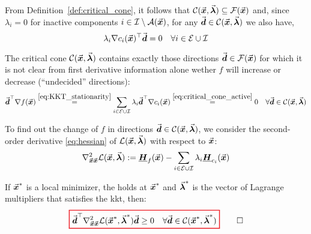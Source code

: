 From Definition~\ref{def:critical_cone}, it follows that \(\mathcal{C}(\vec{\boldsymbol{x}},\vec{\boldsymbol{\lambda}}) \subseteq \mathcal{F}(\vec{\boldsymbol{x}})\) and, since \(\lambda_i = 0\) for inactive components \(i \in \mathcal{I}\setminus\mathcal{A}(\vec{\boldsymbol{x}})\), for any \(\vec{\boldsymbol{d}} \in \mathcal{C}(\vec{\boldsymbol{x}},\vec{\boldsymbol{\lambda}})\) we also have,
\begin{equation}\label{eq:critical_cone_active}
  \lambda_i \nabla c_i(\vec{\boldsymbol{x}})^{\top} \vec{\boldsymbol{d}} = 0 \quad \forall i \in \mathcal{E} \cup \mathcal{I} 
\end{equation}

The critical cone \(\mathcal{C}(\vec{\boldsymbol{x}},\vec{\boldsymbol{\lambda}})\) contains exactly those directions \(\vec{\boldsymbol{d}} \in \mathcal{F}(\vec{\boldsymbol{x}})\) for which it is not clear from first derivative information alone wether \(f\) will increase or decrease (``undecided'' directions):
\begin{equation}\label{eq:critical_cone_contains_undecided}
  \vec{\boldsymbol{d}}^\top \nabla f(\vec{\boldsymbol{x}})
  \overset{\eqref{eq:KKT_stationarity}}{=} 
  \sum_{i\in\mathcal{E}\cup\mathcal{I}} \lambda_i \vec{\boldsymbol{d}}^\top \nabla c_i(\vec{\boldsymbol{x}}) 
  \overset{\eqref{eq:critical_cone_active}}{=} 
  0 \quad \forall \vec{\boldsymbol{d}} \in \mathcal{C}(\vec{\boldsymbol{x}},\vec{\boldsymbol{\lambda}})
  \end{equation}

To find out the change of \(f\) in directions \(\vec{\boldsymbol{d}} \in \mathcal{C}(\vec{\boldsymbol{x}},\vec{\boldsymbol{\lambda}})\), we consider the second-order derivative \eqref{eq:hessian} of \(\mathcal{L}(\vec{\boldsymbol{x}},\vec{\boldsymbol{\lambda}})\) with respect to \(\vec{\boldsymbol{x}}\):
\[
\nabla^{2}_{\vec{\boldsymbol{x}}\vec{\boldsymbol{x}}} \mathcal{L}(\vec{\boldsymbol{x}},\vec{\boldsymbol{\lambda}}) := \underline{\boldsymbol{H}}_{f}(\vec{\boldsymbol{x}}) - \sum_{i\in\mathcal{E}\cup\mathcal{I}} \lambda_{i} \underline{\boldsymbol{H}}_{c_{i}}(\vec{\boldsymbol{x}})
\]

\begin{theorem}\label{thm:SONC}
If \( \vec{\boldsymbol{x}}^{\ast} \) is a local minimizer, the  holds at \(\vec{\boldsymbol{x}}^{\ast}\) and \( \vec{\boldsymbol{\lambda}}^{\ast} \) is the vector of Lagrange multipliers that satisfies the \gls{kkt}, then:
\begin{equation}\label{eq:SONC}
{\color{Red}
\setlength{\fboxrule}{1pt}
\boxed{ 
\color{black}
\vect{d}^{\top} \nabla^{2}_{\vect{x}\vect{x}} \mathcal{L}(\vect{x}^{\ast},\vect{\lambda}^{\ast}) \vect{d} \ge 0 \quad \forall \vect{d}\in\mathcal{C}(\vect{x}^{\ast},\vect{\lambda}^{\ast})
}
}\qedhere
\end{equation}
\end{theorem}

